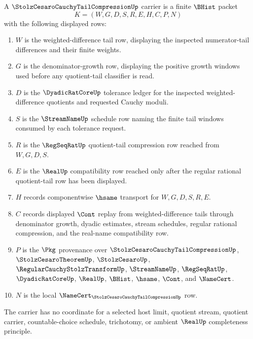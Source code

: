 \begin{definition}
\label{def:stolz-cesaro-cauchy-tail-compression-carrier}
A $\StolzCesaroCauchyTailCompressionUp$ carrier is a finite $\BHist$ packet
$$
K=(W,G,D,S,R,E,H,C,P,N)
$$
with the following displayed rows:
\begin{enumerate}
\item $W$ is the weighted-difference tail row, displaying the inspected numerator-tail differences and their finite weights.
\item $G$ is the denominator-growth row, displaying the positive growth windows used before any quotient-tail classifier is read.
\item $D$ is the $\DyadicRatCoreUp$ tolerance ledger for the inspected weighted-difference quotients and requested Cauchy moduli.
\item $S$ is the $\StreamNameUp$ schedule row naming the finite tail windows consumed by each tolerance request.
\item $R$ is the $\RegSeqRatUp$ quotient-tail compression row reached from $W,G,D,S$.
\item $E$ is the $\RealUp$ compatibility row reached only after the regular rational quotient-tail row has been displayed.
\item $H$ records componentwise $\hsame$ transport for $W,G,D,S,R,E$.
\item $C$ records displayed $\Cont$ replay from weighted-difference tails through denominator growth, dyadic estimates, stream schedules, regular rational compression, and the real-name compatibility row.
\item $P$ is the $\Pkg$ provenance over $\StolzCesaroCauchyTailCompressionUp$, $\StolzCesaroTheoremUp$, $\StolzCesaroUp$, $\RegularCauchyStolzTransformUp$, $\StreamNameUp$, $\RegSeqRatUp$, $\DyadicRatCoreUp$, $\RealUp$, $\BHist$, $\hsame$, $\Cont$, and $\NameCert$.
\item $N$ is the local $\NameCert_{\StolzCesaroCauchyTailCompressionUp}$ row.
\end{enumerate}
The carrier has no coordinate for a selected host limit, quotient stream, quotient carrier, countable-choice schedule, trichotomy, or ambient $\RealUp$ completeness principle.
\end{definition}

